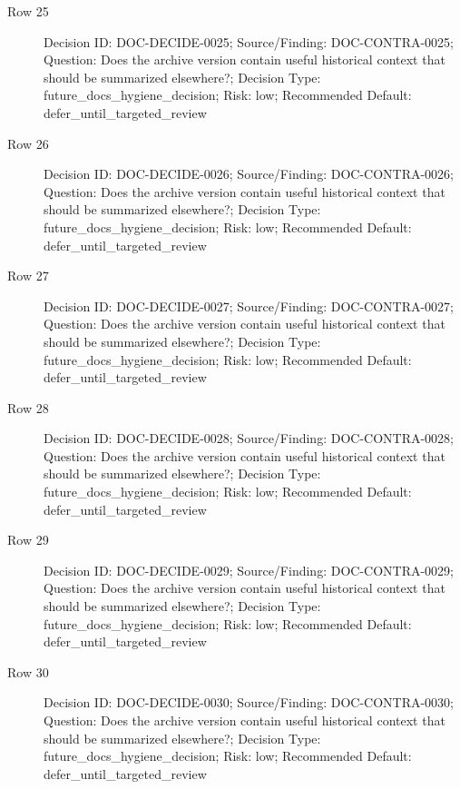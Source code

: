 \documentclass[10.5pt,a4paper,openany]{book}
\begin{document}
\begin{description}
\item[Row 25] Decision ID: DOC-\allowbreak{}DECIDE-\allowbreak{}0025; Source/\allowbreak{}Finding: DOC-\allowbreak{}CONTRA-\allowbreak{}0025; Question: Does the archive version contain useful historical context that should be summarized elsewhere?; Decision Type: future\_\allowbreak{}docs\_\allowbreak{}hygiene\_\allowbreak{}decision; Risk: low; Recommended Default: defer\_\allowbreak{}until\_\allowbreak{}targeted\_\allowbreak{}review
\item[Row 26] Decision ID: DOC-\allowbreak{}DECIDE-\allowbreak{}0026; Source/\allowbreak{}Finding: DOC-\allowbreak{}CONTRA-\allowbreak{}0026; Question: Does the archive version contain useful historical context that should be summarized elsewhere?; Decision Type: future\_\allowbreak{}docs\_\allowbreak{}hygiene\_\allowbreak{}decision; Risk: low; Recommended Default: defer\_\allowbreak{}until\_\allowbreak{}targeted\_\allowbreak{}review
\item[Row 27] Decision ID: DOC-\allowbreak{}DECIDE-\allowbreak{}0027; Source/\allowbreak{}Finding: DOC-\allowbreak{}CONTRA-\allowbreak{}0027; Question: Does the archive version contain useful historical context that should be summarized elsewhere?; Decision Type: future\_\allowbreak{}docs\_\allowbreak{}hygiene\_\allowbreak{}decision; Risk: low; Recommended Default: defer\_\allowbreak{}until\_\allowbreak{}targeted\_\allowbreak{}review
\item[Row 28] Decision ID: DOC-\allowbreak{}DECIDE-\allowbreak{}0028; Source/\allowbreak{}Finding: DOC-\allowbreak{}CONTRA-\allowbreak{}0028; Question: Does the archive version contain useful historical context that should be summarized elsewhere?; Decision Type: future\_\allowbreak{}docs\_\allowbreak{}hygiene\_\allowbreak{}decision; Risk: low; Recommended Default: defer\_\allowbreak{}until\_\allowbreak{}targeted\_\allowbreak{}review
\item[Row 29] Decision ID: DOC-\allowbreak{}DECIDE-\allowbreak{}0029; Source/\allowbreak{}Finding: DOC-\allowbreak{}CONTRA-\allowbreak{}0029; Question: Does the archive version contain useful historical context that should be summarized elsewhere?; Decision Type: future\_\allowbreak{}docs\_\allowbreak{}hygiene\_\allowbreak{}decision; Risk: low; Recommended Default: defer\_\allowbreak{}until\_\allowbreak{}targeted\_\allowbreak{}review
\item[Row 30] Decision ID: DOC-\allowbreak{}DECIDE-\allowbreak{}0030; Source/\allowbreak{}Finding: DOC-\allowbreak{}CONTRA-\allowbreak{}0030; Question: Does the archive version contain useful historical context that should be summarized elsewhere?; Decision Type: future\_\allowbreak{}docs\_\allowbreak{}hygiene\_\allowbreak{}decision; Risk: low; Recommended Default: defer\_\allowbreak{}until\_\allowbreak{}targeted\_\allowbreak{}review

\end{description}
\end{document}
